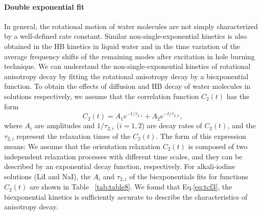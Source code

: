 \paragraph{Double exponential fit}
In general, the rotational motion of water molecules are not simply characterized by a well-defined rate constant. 
Similar non-single-exponential kinetics is also obtained in the HB kinetics
in liquid water \cite{AL96,Dirama2005} and in the time variation of the average frequency shifts of the 
remaining modes after excitation in hole burning technique.\cite{Rey2002,Moller2004} 
We can understand the non-single-exponential kinetics of rotational 
anisotropy decay by fitting the rotational anisotropy decay by a 
biexponential function.
To obtain the effects of diffusion and HB decay of water molecules
in solutions respectively, we assume that 
the correlation function $C_2(t)$ has the form \cite{TanHS05}
\begin{equation}
C_2(t)=A_1e^{-t/\tau_{2,1}} +A_2e^{-t/\tau_{2,2}},
\label{eq:tcf3}
\end{equation}
where $A_i$ are amplitudes and $1/\tau_{2,i}$ ($i=1, 2$) are decay rates of $C_2(t)$,
and the $\tau_{2,i}$ represent the relaxation times of the $C_2(t)$. 
The form of this expression means: We assume that the orientation relaxation $C_2(t)$ is composed of two independent relaxation processes 
with different time scales, and they can be described by an exponential decay function, respectively.
For alkali-iodine solutions (LiI and NaI), the $A_i$ and $\tau_{2,i}$ of the biexponentials fits for functions 
$C_2(t)$ are shown in Table ~\ref{tab:table8}.
We found that Eq.\thinspace\ref{eq:tcf3}, the biexponential kinetics is sufficiently accurate to 
describe the characteristics of anisotropy decay.                        

